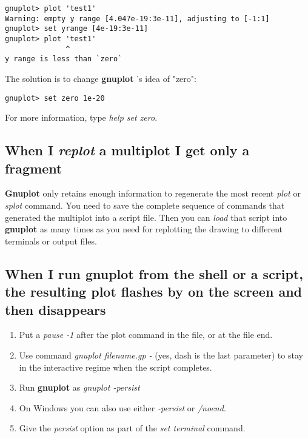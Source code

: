 \documentclass[a4paper,11pt]{article}
\newcommand{\gnuplot}{\textbf{gnuplot }}
\newcommand{\Gnuplot}{\textbf{Gnuplot }}
\begin{document}
\small
\begin{verbatim}
gnuplot> plot 'test1'
Warning: empty y range [4.047e-19:3e-11], adjusting to [-1:1]
gnuplot> set yrange [4e-19:3e-11]
gnuplot> plot 'test1'
              ^
y range is less than `zero`
\end{verbatim}
\normalsize

The solution is to change \gnuplot's idea of "zero":
\small
\begin{verbatim}
gnuplot> set zero 1e-20
\end{verbatim}
\normalsize

For more information, type {\em help set zero}.

\subsection{When I {\em replot} a multiplot I get only a fragment}

\Gnuplot only retains enough information to regenerate the most recent
{\em plot} or {\em splot} command.
You need to save the complete sequence of commands that generated the
multiplot into a script file. Then you can {\em load} that script into
\gnuplot as many times as you need for replotting the drawing to different
terminals or output files.

\subsection{When I run \gnuplot from the shell or a script, the resulting plot flashes by on the screen and then disappears}

\begin{enumerate}
\item Put a {\em pause -1} after the plot command in the file, or at the file end.

\item Use command {\em gnuplot filename.gp -} (yes, dash is the last
parameter) to stay in the interactive regime when the script completes.

\item Run \gnuplot as \textit{gnuplot -persist}

\item On Windows you can also use either {\em -persist} or {\em /noend}.

\item Give the \textit{persist} option as part of the \textit{set terminal} command.
\end{enumerate}
\end{document}
